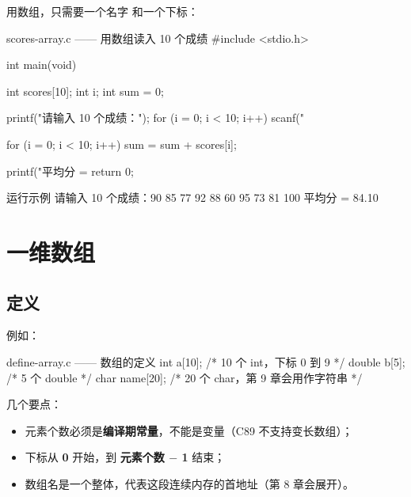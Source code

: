 用数组，只需要一个名字  和一个下标：

\begin{codebox}{scores-array.c —— 用数组读入 10 个成绩}
#include <stdio.h>

int main(void)
{
    int scores[10];
    int i;
    int sum = 0;

    printf("请输入 10 个成绩：");
    for (i = 0; i < 10; i++) {
        scanf("%
    }

    for (i = 0; i < 10; i++) {
        sum = sum + scores[i];
    }

    printf("平均分 = %
    return 0;
}
\end{codebox}

\begin{outbox}{运行示例}
请输入 10 个成绩：90 85 77 92 88 60 95 73 81 100
平均分 = 84.10
\end{outbox}

\begin{center}
\end{center}

\section{一维数组}

\subsection{定义}

\begin{center}
\end{center}

例如：

\begin{codebox}{define-array.c —— 数组的定义}
int a[10];          /* 10 个 int，下标 0 到 9 */
double b[5];        /* 5 个 double */
char name[20];      /* 20 个 char，第 9 章会用作字符串 */
\end{codebox}

几个要点：

\begin{itemize}
  \item 元素个数必须是\textbf{编译期常量}，不能是变量（C89 不支持变长数组）；
  \item 下标从 \textbf{0} 开始，到 \textbf{元素个数 $-$ 1} 结束；
  \item 数组名是一个整体，代表这段连续内存的首地址（第 8 章会展开）。
\end{itemize}

